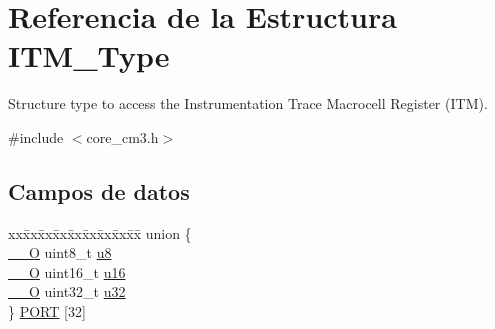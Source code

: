\hypertarget{struct_i_t_m___type}{}\section{Referencia de la Estructura I\+T\+M\+\_\+\+Type}
\label{struct_i_t_m___type}


Structure type to access the Instrumentation Trace Macrocell Register (I\+TM).  




{\ttfamily \#include $<$core\+\_\+cm3.\+h$>$}

\subsection*{Campos de datos}
\begin{DoxyCompactItemize}
\item 
\begin{tabbing}
xx\=xx\=xx\=xx\=xx\=xx\=xx\=xx\=xx\=\kill
union \{\\
\>\hyperlink{core__sc300_8h_a7e25d9380f9ef903923964322e71f2f6}{\_\_O} uint8\_t \hyperlink{struct_i_t_m___type_a0374c0b98ab9de6f71fabff7412df832}{u8}\\
\>\hyperlink{core__sc300_8h_a7e25d9380f9ef903923964322e71f2f6}{\_\_O} uint16\_t \hyperlink{struct_i_t_m___type_ae8d499140220fa6d4eab1da7262bf08e}{u16}\\
\>\hyperlink{core__sc300_8h_a7e25d9380f9ef903923964322e71f2f6}{\_\_O} uint32\_t \hyperlink{struct_i_t_m___type_acaf6d0e14a3d4b541c624913b4a1931e}{u32}\\
\} \hyperlink{struct_i_t_m___type_a85a40c43c0c3a77535a31a0aefc0fe76}{PORT} \mbox{[}32\mbox{]}\\


\end{tabbing}
\end{DoxyCompactItemize}
